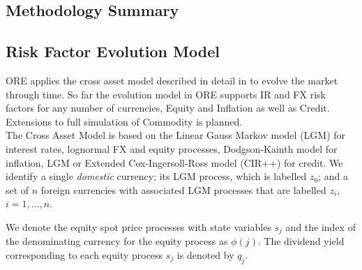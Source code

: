 \documentclass[12pt, a4paper]{article}
\begin{document}
{{%




\newpage
\begin{appendix}

\section{Methodology Summary}

\subsection{Risk Factor Evolution Model}\label{sec:app_rfe}

ORE applies the cross asset model described in detail in \cite{Lichters} to evolve  the market through time. So far the
evolution model in ORE supports IR and FX risk factors for any number of currencies, Equity and Inflation as well as Credit. Extensions to full simulation of Commodity is planned. \\

The Cross Asset Model is based on the Linear Gauss Markov model (LGM) for interest rates, lognormal FX and equity 
processes, Dodgson-Kainth model for inflation, LGM or Extended Cox-Ingersoll-Ross model (CIR++) for credit.
We identify a single {\em domestic} currency; its LGM process,
which is labelled $z_0$; and a set of $n$ foreign currencies with associated LGM processes that are labelled $z_i$, 
$i=1,\dots,n$. 

We denote the equity spot price processes with state variables $s_j$ and the index of the denominating 
currency for the equity process as $\phi(j)$. The dividend yield corresponding to each equity process $s_j$ is denoted 
by $q_j$.


\end{appendix}}}
\end{document}
